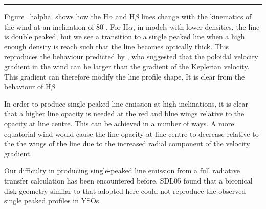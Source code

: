 \documentclass[preprint, a4paper, 11pt]{aastex}
\begin{document}
\noindent\rule{16cm}{0.4pt}


Figure~\ref{halpha} shows how the H$\alpha$ and H$\beta$ lines change with the kinematics 
of the wind at an inclination of $80^\circ$. For H$\alpha$, in models with lower densities, the
line is double peaked, but we see a transition to a single peaked line when 
a high enough density is reach such that the line becomes optically thick.
This reproduces the behaviour predicted by \cite{MC96}, who suggested that
the poloidal velocity gradient in the wind can be larger than the gradient of 
the Keplerian velocity. This gradient can therefore modify the line profile shape.
It is clear from the behaviour of H$\beta$ 

In order to produce single-peaked line emission at high inclinations,
it is clear that a higher line opacity is needed at the red and blue wings relative to
the opacity at line centre. This can be achieved in a number of ways. A more equatorial 
wind would cause the line opacity at line centre to decrease
relative to the the wings of the line due to the increased radial component 
of the velocity gradient. 

Our difficulty in producing single-peaked line emission from a full 
radiative transfer calculation has been encountered before. SDL05 found that a 
biconical disk geometry similar to that adopted here could not reproduce 
the observed single peaked profiles in YSOs.  
\end{document}
